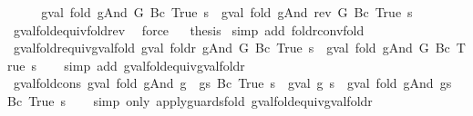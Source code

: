 \begin{isabellebody}
%
\isadelimproof
%
\endisadelimproof
%
\isatagproof
{}\isamarkupfalse%
\ {\isacharminus}\isanewline
\ \ \isamarkupfalse%
\ {\isachardoublequoteopen}gval\ {\isacharparenleft}fold\ gAnd\ G\ {\isacharparenleft}Bc\ True{\isacharparenright}{\isacharparenright}\ s\ {\isacharequal}\ gval\ {\isacharparenleft}fold\ gAnd\ {\isacharparenleft}rev\ G{\isacharparenright}\ {\isacharparenleft}Bc\ True{\isacharparenright}{\isacharparenright}\ s{\isachardoublequoteclose}\isanewline
\ \ \ \ \isamarkupfalse%
\ gval{\isacharunderscore}fold{\isacharunderscore}equiv{\isacharunderscore}fold{\isacharunderscore}rev\ \isamarkupfalse%
\ force\isanewline
{}\isamarkupfalse%
\ \isamarkupfalse%
\ {\isacharquery}thesis\isanewline
{}\isamarkupfalse%
\ {\isacharparenleft}simp\ add{\isacharcolon}\ foldr{\isacharunderscore}conv{\isacharunderscore}fold{\isacharparenright}\isanewline
{}\isamarkupfalse%
%
\endisatagproof
{\isafoldproof}%
%
\isadelimproof
\isanewline
%
\endisadelimproof
\isanewline
{}\isamarkupfalse%
\ gval{\isacharunderscore}foldr{\isacharunderscore}equiv{\isacharunderscore}gval{\isacharunderscore}fold{\isacharcolon}\ {\isachardoublequoteopen}gval\ {\isacharparenleft}foldr\ gAnd\ G\ {\isacharparenleft}Bc\ True{\isacharparenright}{\isacharparenright}\ s\ {\isacharequal}\ gval\ {\isacharparenleft}fold\ gAnd\ G\ {\isacharparenleft}Bc\ True{\isacharparenright}{\isacharparenright}\ s{\isachardoublequoteclose}\isanewline
%
\isadelimproof
\ \ %
\endisadelimproof
%
\isatagproof
{}\isamarkupfalse%
\ {\isacharparenleft}simp\ add{\isacharcolon}\ gval{\isacharunderscore}fold{\isacharunderscore}equiv{\isacharunderscore}gval{\isacharunderscore}foldr{\isacharparenright}%
\endisatagproof
{\isafoldproof}%
%
\isadelimproof
\isanewline
%
\endisadelimproof
\isanewline
{}\isamarkupfalse%
\ gval{\isacharunderscore}fold{\isacharunderscore}cons{\isacharcolon}\ {\isachardoublequoteopen}gval\ {\isacharparenleft}fold\ gAnd\ {\isacharparenleft}g\ {\isacharhash}\ gs{\isacharparenright}\ {\isacharparenleft}Bc\ True{\isacharparenright}{\isacharparenright}\ s\ {\isacharequal}\ gval\ g\ s\ {\isasymand}\isactrlsub {\isacharquery}\ gval\ {\isacharparenleft}fold\ gAnd\ gs\ {\isacharparenleft}Bc\ True{\isacharparenright}{\isacharparenright}\ s{\isachardoublequoteclose}\isanewline
%
\isadelimproof
\ \ %
\endisadelimproof
%
\isatagproof
{}\isamarkupfalse%
\ {\isacharparenleft}simp\ only{\isacharcolon}\ apply{\isacharunderscore}guards{\isacharunderscore}fold\ gval{\isacharunderscore}fold{\isacharunderscore}equiv{\isacharunderscore}gval{\isacharunderscore}foldr{\isacharparenright}\isanewline

\end{isabellebody}
